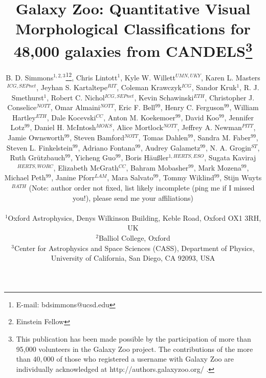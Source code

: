 \documentclass[useAMS,usenatbib]{mn2e}
\def\noteb		{\color{titlecol} \nbf}
\def\builderUC       {} %
\begin{document}
\title[Galaxy Zoo CANDELS Data Release]{Galaxy Zoo: Quantitative Visual Morphological Classifications for 48,000 galaxies from CANDELS\thanks{This publication has been made possible by the participation of more than 95,000 volunteers in the Galaxy Zoo project. The contributions of the more than $40,000$ of those who registered a username with Galaxy Zoo are
individually acknowledged at http://authors.galaxyzoo.org/ .} } 

\author[Simmons et al.]{\parbox[t]{16cm}{B. D. Simmons$^{1,2,3}$\thanks{E-mail: bdsimmons@ucsd.edu}\footnote{Einstein Fellow}, 
Chris Lintott$^{1}$, 
Kyle W. Willett$^{UMN,UKY}$, 
Karen L. Masters$^{ICG,SEPnet}$, 
Jeyhan S. Kartaltepe$^{RIT}$, 
Coleman Krawczyk$^{ICG}$,
Sandor Kruk$^{1}$,
R. J. Smethurst$^{1}$, 
Robert C. Nichol$^{ICG,SEPnet}$, 
Kevin Schawinski$^{ETH}$, 
Christopher J. Conselice$^{NOTT}$,
Omar Almaini$^{NOTT}$, 
Eric F. Bell$^{99}$,
Henry C. Ferguson$^{99}$,
William Hartley$^{ETH}$, 
Dale Kocevski$^{CC}$,
Anton M. Koekemoer$^{99}$,
David Koo$^{99}$,
Jennifer Lotz$^{99}$,
Daniel H. McIntosh$^{MOKS}$,
Alice Mortlock$^{NOTT}$, 
{Jeffrey A. Newman$^{PITT}$,}
Jamie Ownsworth$^{99}$, 
Steven Bamford$^{NOTT}$,
{\builderUC Tomas Dahlen$^{99}$,} 
{\builderUC Sandra M. Faber$^{99}$,}
{\builderUC Steven L. Finkelstein$^{99}$,} 
{\builderUC Adriano Fontana$^{99}$,}
{\builderUC Audrey Galametz$^{99}$,}
N. A. Grogin$^{ST}$,
{\builderUC Ruth Gr\"utzbauch$^{99}$,} 
{\builderUC Yicheng Guo$^{99}$,}
{\builderUC Boris H\"au\ss ler$^{1,HERTS,ESO}$,}
Sugata Kaviraj$^{HERTS, WORC}$,
Elizabeth McGrath$^{CC}$,
Bahram Mobasher$^{99}$,
Mark Mozena$^{99}$,
{\builderUC Michael Peth$^{99}$,}
Janine Pforr$^{LAM}$,
{\builderUC Mara Salvato$^{99}$,} 
{\builderUC Tommy Wiklind$^{99}$,} 
{\builderUC Stijn Wuyts$^{BATH}$}
{\noteb (Note: author order not fixed, list likely incomplete (ping me if I missed you!), please send me your affiliations)}
%
\vspace{0.1in} }\\
$^{1}$Oxford Astrophysics, Denys Wilkinson Building, Keble Road, Oxford OX1 3RH, UK\\
$^{2}$Balliol College, Oxford\\
$^{3}$Center for Astrophysics and Space Sciences (CASS), Department of Physics, University of California, San Diego, CA 92093, USA\\
}
\end{document}
